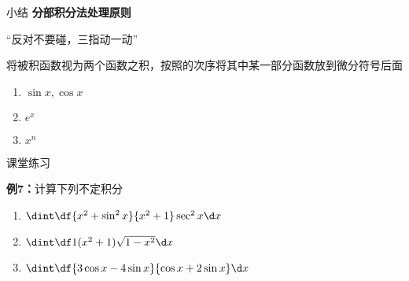 \begin{frame}{小结}
	\linespread{1.2}\pause 
 	{\bf 分部积分法处理原则}\pause 
 	\begin{center}
 		{\bb “\alert{反对}不要碰，\alert{三指}动一动”}\pause 
 	\end{center}
 	将被积函数视为两个函数之积，按照{}的次序将其中某一部分函数放到微分符号后面\pause 
 	\begin{enumerate}
 	  \item $\sin x,\cos x$\pause 
 	  \item $e^x$\pause 
 	  \item $x^n$
 	\end{enumerate}
\end{frame}


\begin{frame}{课堂练习}
	\linespread{1.2}
	\begin{exampleblock}{{\bf 例7：}计算下列不定积分\hfill}
		\begin{enumerate}
		  \item $\dint\df{x^2+\sin^2x}{x^2+1}\sec^2x\d x$
		  \item $\dint\df 1{(x^2+1)\sqrt{1-x^2}}\d x$
		  \item $\dint\df{3\cos x-4\sin x}{\cos x+2\sin x}\d x$
		\end{enumerate}
	\end{exampleblock}
\end{frame}